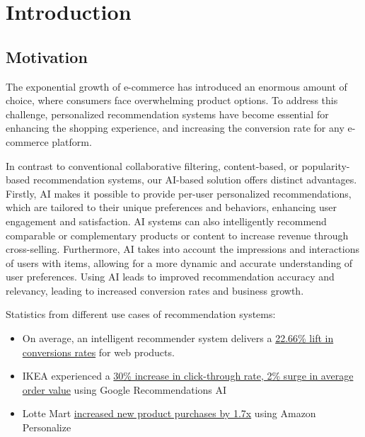 \chapter{Introduction}
\minitoc

\section{Motivation}

The exponential growth of e-commerce has introduced an enormous amount of choice, where consumers face overwhelming product options. To address this challenge, personalized recommendation systems have become essential for enhancing the shopping experience, and increasing the conversion rate for any e-commerce platform.

In contrast to conventional collaborative filtering\cite{NvidiaRecSys}, content-based\cite{NvidiaRecSys}, or popularity-based recommendation systems, our AI-based solution offers distinct advantages. Firstly, AI makes it possible to provide per-user personalized recommendations, which are tailored to their unique preferences and behaviors, enhancing user engagement and satisfaction. AI systems can also intelligently recommend comparable or complementary products or content to increase revenue through cross-selling. Furthermore, AI takes into account the impressions and interactions of users with items, allowing for a more dynamic and accurate understanding of user preferences. Using AI leads to improved recommendation accuracy and relevancy, leading to increased conversion rates and business growth.
    




Statistics from different use cases of recommendation systems:

\begin{itemize}
    \item On average, an intelligent recommender system delivers a \underline{22.66\% lift in conversions rates} \cite{salesforce2014predictive} for web products.
    \item IKEA experienced a \underline{30\% increase in click-through rate, 2\% surge in average order value} \cite{IkeaRecAtGoogleCloudSummit}  using Google Recommendations AI \cite{GoogleRecommendationsAI}
    \item Lotte Mart \underline{increased new product purchases by 1.7x} \cite{LotteMartAwsPersonalize} using Amazon Personalize \cite{AWSPersonalize}
\end{itemize}

